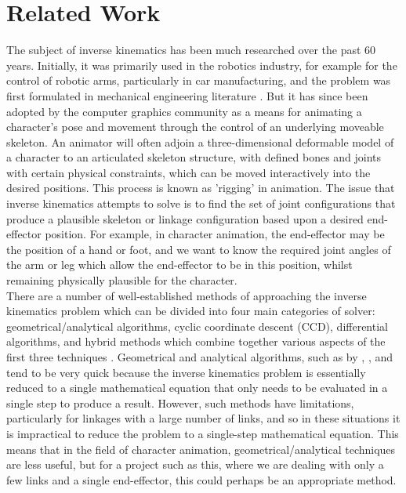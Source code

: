 \documentclass[paper=a4, fontsize=11pt]{scrartcl} %
\numberwithin{equation}{section} %
\numberwithin{figure}{section} %
\numberwithin{table}{section} %
\begin{document}

\section{Related Work}
The subject of inverse kinematics has been much researched over the past 60 years. Initially, it was primarily used in the robotics industry, for example for the control of robotic arms, particularly in car manufacturing, and the problem was first formulated in mechanical engineering literature \cite{Crai55}. But it has since been adopted by the computer graphics community as a means for animating a character's pose and movement through the control of an underlying moveable skeleton. An animator will often adjoin a three-dimensional deformable model of a character to an articulated skeleton structure, with defined bones and joints with certain physical constraints, which can be moved interactively into the desired positions. This process is known as 'rigging' in animation. The issue that inverse kinematics attempts to solve is to find the set of joint configurations that produce a plausible skeleton or linkage configuration based upon a desired end-effector position. For example, in character animation, the end-effector may be the position of a hand or foot, and we want to know the required joint angles of the arm or leg which allow the end-effector to be in this position, whilst remaining physically plausible for the character. \\

There are a number of well-established methods of approaching the inverse kinematics problem which can be divided into four main categories of solver: geometrical/analytical algorithms, cyclic coordinate descent (CCD), differential algorithms, and hybrid methods which combine together various aspects of the first three techniques \cite{Madd04}. Geometrical and analytical algorithms, such as by \cite{Kwan00}, \cite{Chin96}, and \cite{Paul88} tend to be very quick because the inverse kinematics problem is essentially reduced to a single mathematical equation that only needs to be evaluated in a single step to produce a result. However, such methods have limitations, particularly for linkages with a large number of links, and so in these situations it is impractical to reduce the problem to a single-step mathematical equation. This means that in the field of character animation, geometrical/analytical techniques are less useful, but for a project such as this, where we are dealing with only a few links and a single end-effector, this could perhaps be an appropriate method. \\
\end{document}
